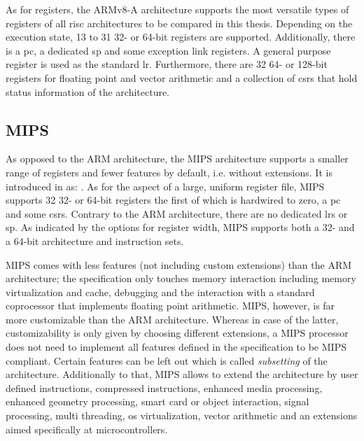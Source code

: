 As for registers, the ARMv8-A architecture supports the most versatile types of registers of all \gls{risc} architectures to be compared in this thesis.
Depending on the execution state, 13 to 31 32- or 64-bit registers are supported.
Additionally, there is a \gls{pc}, a dedicated \gls{sp} and some exception link registers.
A general purpose register is used as the standard \gls{lr}.
Furthermore, there are 32 64- or 128-bit registers for floating point and vector arithmetic and a collection of \glspl{csr} that hold status information of the architecture.

\subsection{MIPS}

As opposed to the ARM architecture, the MIPS architecture supports a smaller range of registers and fewer features by default, i.e. without extensions.
It is introduced in  \cite{MIPS} as: .
As for the aspect of a large, uniform register file, MIPS supports 32 32- or 64-bit registers the first of which is hardwired to zero, a \gls{pc} and some \glspl{csr}.
Contrary to the ARM architecture, there are no dedicated \glspl{lr} or \gls{sp}.
As indicated by the options for register width, MIPS supports both a 32- and a 64-bit architecture and instruction sets.

MIPS comes with less features (not including custom extensions) than the ARM architecture; the specification only touches memory interaction including memory virtualization and cache, debugging and the interaction with a standard coprocessor that implements floating point arithmetic.
MIPS, however, is far more customizable than the ARM architecture.
Whereas in case of the latter, customizability is only given by choosing different extensions, a MIPS processor does not need to implement all features defined in the specification to be MIPS compliant.
Certain features can be left out which is called \textit{subsetting} of the architecture.
Additionally to that, MIPS allows to extend the architecture by user defined instructions, compressed instructions, enhanced media processing, enhanced geometry processing, smart card or object interaction, signal processing, multi threading, \gls{os} virtualization, vector arithmetic and an extensions aimed specifically at microcontrollers.

